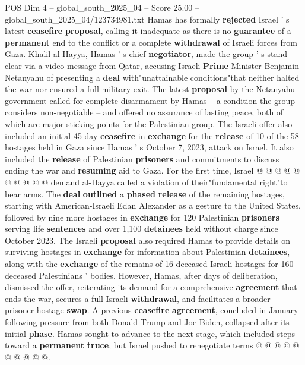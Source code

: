 \begin{textsample}{POS Dim 4 – global\_south\_2025\_04 – Score 25.00 – global\_south\_2025\_04/123734981.txt}  \label{ex:f4_pos_242}
Hamas has formally \textbf{rejected} Israel ' s latest \textbf{ceasefire} \textbf{proposal}, calling it inadequate as there is no \textbf{guarantee} of a \textbf{permanent} end to the conflict or a complete \textbf{withdrawal} of Israeli forces from Gaza.
Khalil al-Hayya, Hamas ' s chief \textbf{negotiator}, made the group ' s stand clear via a video message from Qatar, accusing Israeli \textbf{Prime} Minister Benjamin Netanyahu of presenting a \textbf{deal} with"unattainable conditions"that neither halted the war nor ensured a full military exit.
The latest \textbf{proposal} by the Netanyahu government called for complete disarmament by Hamas -- a condition the group considers non-negotiable -- and offered no assurance of lasting peace, both of which are major sticking points for the Palestinian group.
The Israeli offer also included an initial 45-day \textbf{ceasefire} in \textbf{exchange} for the \textbf{release} of 10 of the 58 hostages held in Gaza since Hamas ' s October 7, 2023, attack on Israel.
It also included the \textbf{release} of Palestinian \textbf{prisoners} and commitments to discuss ending the war and \textbf{resuming} aid to Gaza.
For the first time, Israel @ @ @ @ @ @ @ @ @ @ demand al-Hayya called a violation of their"fundamental right"to bear arms.
The \textbf{deal} \textbf{outlined} a \textbf{phased} \textbf{release} of the remaining hostages, starting with American-Israeli Edan Alexander as a gesture to the United States, followed by nine more hostages in \textbf{exchange} for 120 Palestinian \textbf{prisoners} serving life \textbf{sentences} and over 1,100 \textbf{detainees} held without charge since October 2023.
The Israeli \textbf{proposal} also required Hamas to provide details on surviving hostages in \textbf{exchange} for information about Palestinian \textbf{detainees}, along with the \textbf{exchange} of the remains of 16 deceased Israeli hostages for 160 deceased Palestinians ' bodies.
However, Hamas, after days of deliberation, dismissed the offer, reiterating its demand for a comprehensive \textbf{agreement} that ends the war, secures a full Israeli \textbf{withdrawal}, and facilitates a broader prisoner-hostage \textbf{swap}.
A previous \textbf{ceasefire} \textbf{agreement}, concluded in January following pressure from both Donald Trump and Joe Biden, collapsed after its initial \textbf{phase}.
Hamas sought to advance to the next stage, which included steps toward a \textbf{permanent} \textbf{truce}, but Israel pushed to renegotiate terms @ @ @ @ @ @ @ @ @ @.

\end{textsample}
